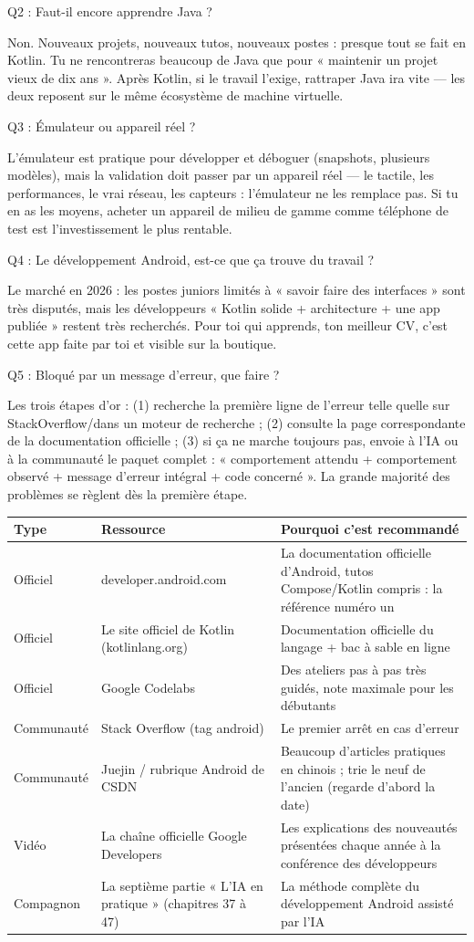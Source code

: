 Q2 : Faut-il encore apprendre Java ?

Non. Nouveaux projets, nouveaux tutos, nouveaux postes : presque tout se fait en Kotlin. Tu ne rencontreras beaucoup de Java que pour « maintenir un projet vieux de dix ans ». Après Kotlin, si le travail l’exige, rattraper Java ira vite — les deux reposent sur le même écosystème de machine virtuelle.

Q3 : Émulateur ou appareil réel ?

L’émulateur est pratique pour développer et déboguer (snapshots, plusieurs modèles), mais la validation doit passer par un appareil réel — le tactile, les performances, le vrai réseau, les capteurs : l’émulateur ne les remplace pas. Si tu en as les moyens, acheter un appareil de milieu de gamme comme téléphone de test est l’investissement le plus rentable.

Q4 : Le développement Android, est-ce que ça trouve du travail ?

Le marché en 2026 : les postes juniors limités à « savoir faire des interfaces » sont très disputés, mais les développeurs « Kotlin solide + architecture + une app publiée » restent très recherchés. Pour toi qui apprends, ton meilleur CV, c’est cette app faite par toi et visible sur la boutique.

Q5 : Bloqué par un message d’erreur, que faire ?

Les trois étapes d’or : (1) recherche la première ligne de l’erreur telle quelle sur StackOverflow/dans un moteur de recherche ; (2) consulte la page correspondante de la documentation officielle ; (3) si ça ne marche toujours pas, envoie à l’IA ou à la communauté le paquet complet : « comportement attendu + comportement observé + message d’erreur intégral + code concerné ». La grande majorité des problèmes se règlent dès la première étape.


\begin{center}
\begin{tabularx}{\linewidth}{|X|X|X|}
\hline
\textbf{Type} & \textbf{Ressource} & \textbf{Pourquoi c’est recommandé} \tabularnewline
\hline
Officiel & developer.android.com & La documentation officielle d’Android, tutos Compose/Kotlin compris : la référence numéro un \tabularnewline
Officiel & Le site officiel de Kotlin (kotlinlang.org) & Documentation officielle du langage + bac à sable en ligne \tabularnewline
Officiel & Google Codelabs & Des ateliers pas à pas très guidés, note maximale pour les débutants \tabularnewline
Communauté & Stack Overflow (tag android) & Le premier arrêt en cas d’erreur \tabularnewline
Communauté & Juejin / rubrique Android de CSDN & Beaucoup d’articles pratiques en chinois ; trie le neuf de l’ancien (regarde d’abord la date) \tabularnewline
Vidéo & La chaîne officielle Google Developers & Les explications des nouveautés présentées chaque année à la conférence des développeurs \tabularnewline
Compagnon & La septième partie « L’IA en pratique » (chapitres 37 à 47) & La méthode complète du développement Android assisté par l’IA \tabularnewline
\hline
\end{tabularx}
\end{center}

